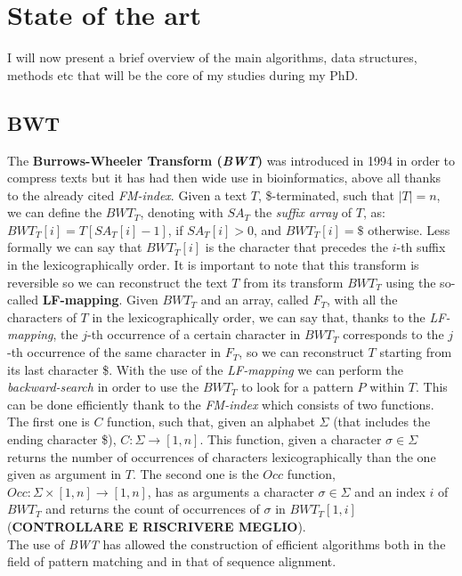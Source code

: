 \documentclass[a4paper,11pt, oneside]{article}
\begin{document}
\section*{State of the art}
I will now present a brief overview of the main algorithms, data structures,
methods etc that will be the core of my studies during my PhD. 
\subsection*{BWT}
The \textbf{Burrows-Wheeler Transform (\textit{BWT})} \cite{bwt} was introduced
in 1994 in order to compress texts but it has had then wide use in
bioinformatics, above all thanks to the already cited \textit{FM-index}. Given a
text $T$, \$-terminated, such that $|T|=n$, we can define the $BWT_T$, denoting
with $SA_T$ the \textit{suffix array} of $T$, as:
$BWT_T[i] = T[SA_T[i]-1]$, if $SA_T[i]>0$, and $BWT_T[i] = \$ $ otherwise. Less
formally we can say that $BWT_T[i]$ is the character that precedes the $i$-th
suffix in the lexicographically order. It is important to note that this
transform is reversible so we can reconstruct the text $T$ from its transform
$BWT_T$ using the so-called \textbf{LF-mapping}. Given $BWT_T$ and an array,
called $F_T$, with all the characters of $T$ in the lexicographically order, we
can say that, thanks to the \textit{LF-mapping}, the $j$-th occurrence of a
certain character in $BWT_T$ corresponds to the $j$-th occurrence of the same
character in $F_T$, so we can reconstruct $T$ starting from its last character
\$. With the use of the \textit{LF-mapping} we can perform the
\textit{backward-search} in order to use the $BWT_T$ to look for a pattern $P$
within $T$. This can be done efficiently thank to the \textit{FM-index} which
consists of two functions. The first one is $C$ function, such that, given an
alphabet $\Sigma$ (that includes the ending character \$),
$C:\Sigma\to[1,n]$. This function, given a character $\sigma\in \Sigma$ returns
the number of occurrences of characters lexicographically than the one given as
argument in $T$. The second one is the $Occ$ function,
$Occ:\Sigma\times[1,n]\to[1,n]$, has as arguments a character $\sigma\in\Sigma$
and an index $i$ of $BWT_T$ and returns the count of occurrences of $\sigma$ in
$BWT_T[1,i]$ (\textbf{CONTROLLARE E RISCRIVERE MEGLIO}).\\
The use of \textit{BWT} has allowed the construction of efficient algorithms
both in the field of pattern matching and in that of sequence alignment. 
\end{document}
